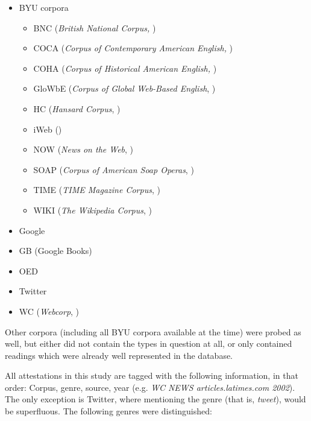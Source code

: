 \begin{itemize}
	\item BYU corpora
	\begin{itemize}
		\item BNC (\textit{British National Corpus,} \citealt{Davies.2004}) 
		\item COCA (\textit{Corpus of Contemporary American English,} \citealt{Davies.2008}) 
	    \item COHA (\textit{Corpus of Historical American English,} \citealt{Davies.2010}) 
	    \item GloWbE (\textit{Corpus of Global Web-Based English}, \citealt{Davies.2013}) 
	    \item HC (\textit{Hansard Corpus}, \citealt{Davies.2015b}) 
	    \item iWeb (\citealt{Davies.2018})   
	    \item NOW (\textit{News on the Web}, \citealt{Davies.2016}) 
	    \item SOAP (\textit{Corpus of American Soap Operas}, \citealt{Davies.2011}) 
	    \item TIME (\textit{TIME Magazine Corpus}, \citealt{Davies.2007}) 
	    \item WIKI (\textit{The Wikipedia Corpus}, \citealt{Davies.2015}) 
	\end{itemize}
	\item Google
	\item GB (Google Books) 
	\item OED 
	\item Twitter
	\item WC (\textit{Webcorp}, \citealt{Renouf.2006}) 
\end{itemize}

\noindent Other corpora (including all BYU corpora available at the time) were probed as well, but either did not contain the types in question at all, or only contained readings which were already well represented in the database. 

All attestations in this study are tagged with the following information, in that order: Corpus, genre, source, year (e.g. \textit{WC NEWS articles.latimes.com 2002}). The only exception is Twitter, where mentioning the genre (that is, \textit{tweet}), would be superfluous. The following genres were distinguished:

